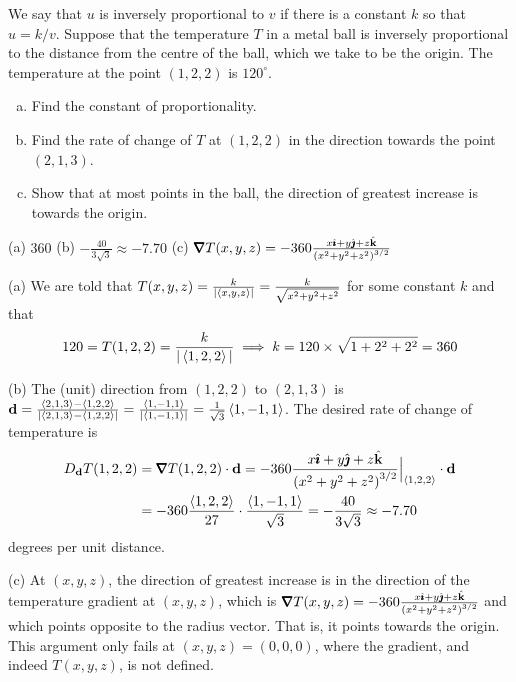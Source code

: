 \begin{question}[M200 2000D] %
We say that $u$ is inversely proportional to $v$ if there
is a constant $k$ so that $u=k/v$. Suppose that the temperature $T$ in
a metal ball is inversely proportional to the distance from the centre
of the ball, which we take to be the origin. The temperature at the point
$(1,2,2)$ is $120^\circ$.
\begin{enumerate}[(a)]
\item
Find the constant of proportionality. 

\item
Find the rate of change of $T$ at $(1,2,2)$ in the direction
towards the point $(2,1,3)$.

\item
Show that at most points in the ball, the direction of greatest
increase is towards the origin.
\end{enumerate}
\end{question}

%

\begin{answer}
(a) $360$\qquad
(b) $-\frac{40}{3\sqrt{3}}\approx-7.70$\qquad
(c) $\vnabla T(x,y,z)=-360\frac{x\hi+y\hj+z\hk}{{(x^2+y^2+z^2)}^{3/2}}$
\end{answer}

\begin{solution}
(a)
We are told that $T(x,y,z)=\frac{k}{|\left< x,y,z\right>|}
=\frac{k}{\sqrt{x^2+y^2+z^2}}$ 
for some constant $k$ and that
\begin{equation*}
120=T(1,2,2)=\frac{k}{|\left< 1,2,2\right>|}
\implies k=120\times\sqrt{1+2^2+2^2}
          = 360
\end{equation*}

(b) The (unit) direction from $(1,2,2)$ to $(2,1,3)$
is $\mathbf{d}=\frac{\left< 2,1,3\right>-\left< 1,2,2\right>}{|\left< 2,1,3\right>-\left< 1,2,2\right>|}
=\frac{\left< 1,-1,1\right>}{|\left< 1,-1,1\right>|}=\frac{1}{\sqrt{3}}\left< 1,-1,1\right>$. 
The desired rate of change of temperature is
\begin{align*}
D_{\vd} T(1,2,2)
&=\vnabla T(1,2,2)\cdot\vd
=-360\frac{x\hi+y\hj+z\hk}{{(x^2+y^2+z^2)}^{3/2}}\Big|_{\llt 1,2,2\rgt}\cdot\vd
\\
&=-360\frac{\llt 1,2,2\rgt}{27}\cdot\frac{\llt 1,-1,1\rgt}{\sqrt{3}}
=-\frac{40}{3\sqrt{3}}\approx-7.70
\end{align*}
degrees per unit distance.

(c) At $(x,y,z)$, the direction of greatest increase is in the direction
of the temperature gradient at $(x,y,z)$, which is 
$\vnabla T(x,y,z)
=-360\frac{x\hi+y\hj+z\hk}{{(x^2+y^2+z^2)}^{3/2}}$
and which points opposite to the radius vector. That is, it points towards
the origin. This argument only fails at $(x,y,z)=(0,0,0)$, where the gradient,
and indeed $T(x,y,z)$, is not defined.
\end{solution}

